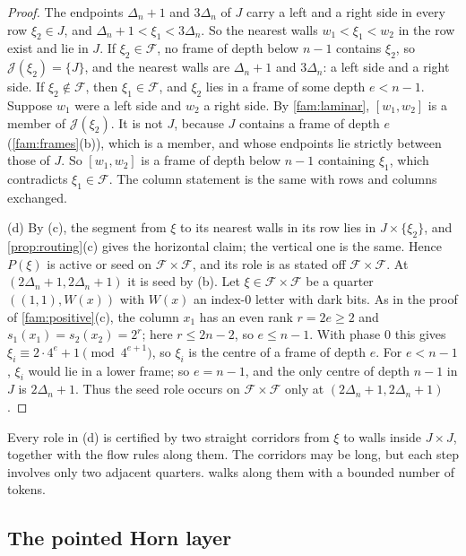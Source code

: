 \begin{proof}
The endpoints $\Delta_n+1$ and $3\Delta_n$ of $J$ carry a left and a right side in every row $\xi_2\in J$, and $\Delta_n+1<\xi_1<3\Delta_n$. So the nearest walls $w_1<\xi_1<w_2$ in the row exist and lie in $J$. If $\xi_2\in\mathcal F$, no frame of depth below $n-1$ contains $\xi_2$, so $\mathcal J(\xi_2)=\{J\}$, and the nearest walls are $\Delta_n+1$ and $3\Delta_n$: a left side and a right side. If $\xi_2\notin\mathcal F$, then $\xi_1\in\mathcal F$, and $\xi_2$ lies in a frame of some depth $e<n-1$. Suppose $w_1$ were a left side and $w_2$ a right side. By \cref{fam:laminar}, $[w_1,w_2]$ is a member of $\mathcal J(\xi_2)$. It is not $J$, because $J$ contains a frame of depth $e$ (\cref{fam:frames}(b)), which is a member, and whose endpoints lie strictly between those of $J$. So $[w_1,w_2]$ is a frame of depth below $n-1$ containing $\xi_1$, which contradicts $\xi_1\in\mathcal F$. The column statement is the same with rows and columns exchanged.

(d) By (c), the segment from $\xi$ to its nearest walls in its row lies in $J\times\{\xi_2\}$, and \cref{prop:routing}(c) gives the horizontal claim; the vertical one is the same. Hence $P(\xi)$ is active or seed on $\mathcal F\times\mathcal F$, and its role is as stated off $\mathcal F\times\mathcal F$. At $(2\Delta_n+1,2\Delta_n+1)$ it is seed by (b). Let $\xi\in\mathcal F\times\mathcal F$ be a quarter $((1,1),W(x))$ with $W(x)$ an index-$0$ letter with dark bits. As in the proof of \cref{fam:positive}(c), the column $x_1$ has an even rank $r=2e\ge2$ and $s_1(x_1)=s_2(x_2)=2^r$; here $r\le2n-2$, so $e\le n-1$. With phase $0$ this gives $\xi_i\equiv2\cdot4^e+1\pmod{4^{e+1}}$, so $\xi_i$ is the centre of a frame of depth $e$. For $e<n-1$, $\xi_i$ would lie in a lower frame; so $e=n-1$, and the only centre of depth $n-1$ in $J$ is $2\Delta_n+1$. Thus the seed role occurs on $\mathcal F\times\mathcal F$ only at $(2\Delta_n+1,2\Delta_n+1)$.
\end{proof}

Every role in (d) is certified by two straight corridors from $\xi$ to walls inside $J\times J$, together with the flow rules along them. The corridors may be long, but each step involves only two adjacent quarters.  walks along them with a bounded number of tokens.

\subsection{The pointed Horn layer}\label{fam:sub-horn}

